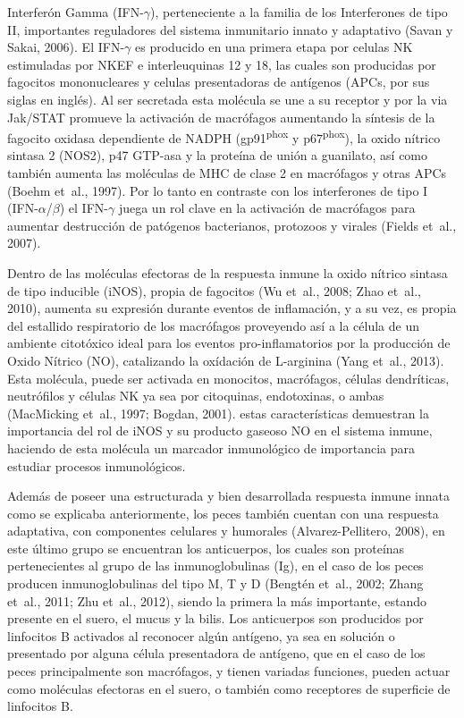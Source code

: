 \documentclass[12pt,letterpaper,oneside]{scrbook}
\begin{document}
Interferón Gamma (IFN-\(\gamma\)), perteneciente a la familia de los
Interferones de tipo II, importantes reguladores del sistema inmunitario
innato y adaptativo (Savan y Sakai, 2006). El IFN-\(\gamma\) es
producido en una primera etapa por celulas NK estimuladas por NKEF e
interleuquinas 12 y 18, las cuales son producidas por fagocitos
mononucleares y celulas presentadoras de antígenos (APCs, por sus siglas
en inglés). Al ser secretada esta molécula se une a su receptor y por la
via Jak/STAT promueve la activación de macrófagos aumentando la síntesis
de la fagocito oxidasa dependiente de NADPH (\si{gp91^{phox}} y
\si{p67^{phox}}), la oxido nítrico sintasa 2 (NOS2), p47 GTP-asa y la
proteína de unión a guanilato, así como también aumenta las moléculas de
MHC de clase 2 en macrófagos y otras APCs (Boehm et~al., 1997). Por lo
tanto en contraste con los interferones de tipo I
(IFN-\(\alpha\)/\(\beta\)) el IFN-\(\gamma\) juega un rol clave en la
activación de macrófagos para aumentar destrucción de patógenos
bacterianos, protozoos y virales (Fields et~al., 2007).

Dentro de las moléculas efectoras de la respuesta inmune la oxido
nítrico sintasa de tipo inducible (iNOS), propia de fagocitos (Wu
et~al., 2008; Zhao et~al., 2010), aumenta su expresión durante eventos
de inflamación, y a su vez, es propia del estallido respiratorio de los
macrófagos proveyendo así a la célula de un ambiente citotóxico ideal
para los eventos pro-inflamatorios por la producción de Oxido Nítrico
(NO), catalizando la oxídación de L-arginina (Yang et~al., 2013). Esta
molécula, puede ser activada en monocitos, macrófagos, células
dendríticas, neutrófilos y células NK ya sea por citoquinas,
endotoxinas, o ambas (MacMicking et~al., 1997; Bogdan, 2001). estas
características demuestran la importancia del rol de iNOS y su producto
gaseoso NO en el sistema inmune, haciendo de esta molécula un marcador
inmunológico de importancia para estudiar procesos inmunológicos.

Además de poseer una estructurada y bien desarrollada respuesta inmune
innata como se explicaba anteriormente, los peces también cuentan con
una respuesta adaptativa, con componentes celulares y humorales
(Alvarez-Pellitero, 2008), en este último grupo se encuentran los
anticuerpos, los cuales son proteínas pertenecientes al grupo de las
inmunoglobulinas (Ig), en el caso de los peces producen inmunoglobulinas
del tipo M, T y D (Bengtén et~al., 2002; Zhang et~al., 2011; Zhu et~al.,
2012), siendo la primera la más importante, estando presente en el
suero, el mucus y la bilis. Los anticuerpos son producidos por
linfocitos B activados al reconocer algún antígeno, ya sea en solución o
presentado por alguna célula presentadora de antígeno, que en el caso de
los peces principalmente son macrófagos, y tienen variadas funciones,
pueden actuar como moléculas efectoras en el suero, o también como
receptores de superficie de linfocitos B.
\end{document}
